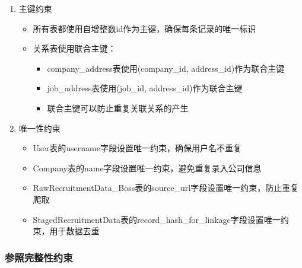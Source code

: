 \begin{enumerate}
  \item 主键约束
  \begin{itemize}
    \item 所有表都使用自增整数id作为主键，确保每条记录的唯一标识
    \item 关系表使用联合主键：
    \begin{itemize}
      \item company\_address表使用(company\_id, address\_id)作为联合主键
      \item job\_address表使用(job\_id, address\_id)作为联合主键
      \item 联合主键可以防止重复关联关系的产生
    \end{itemize}
  \end{itemize}

  \item 唯一性约束
  \begin{itemize}
    \item User表的username字段设置唯一约束，确保用户名不重复
    \item Company表的name字段设置唯一约束，避免重复录入公司信息
    \item RawRecruitmentData\_Boss表的source\_url字段设置唯一约束，防止重复爬取
    \item StagedRecruitmentData表的record\_hash\_for\_linkage字段设置唯一约束，用于数据去重
  \end{itemize}
\end{enumerate}

\subsubsection{参照完整性约束}

